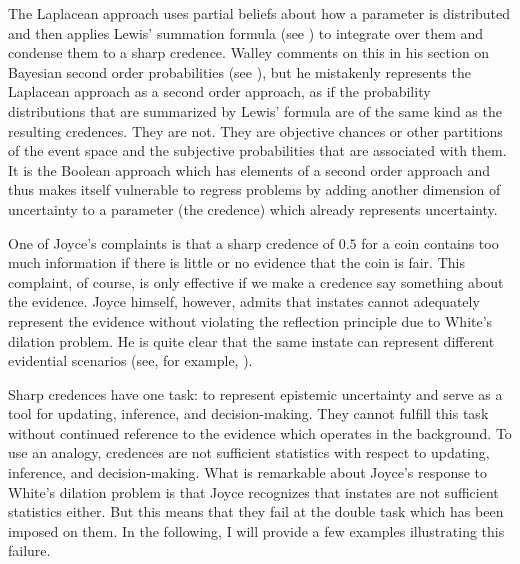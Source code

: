 The Laplacean approach uses partial beliefs about how a
parameter is distributed and then applies Lewis'
summation formula (see ) to
integrate over them and condense them to a sharp
credence. Walley comments on this  in
his section on Bayesian second order probabilities (see
), but he mistakenly
represents the Laplacean approach as a second order
approach, as if the probability distributions that are
summarized by Lewis' formula are of the same kind as
the resulting credences. They are not. They are
objective chances or other partitions of the event
space and the subjective probabilities that are
associated with them. It is the Boolean approach which
has elements of a second order approach and thus makes
itself vulnerable to regress problems by adding another
dimension of uncertainty to a parameter (the credence)
which already represents uncertainty.

One of Joyce's complaints is that a sharp credence of
$0.5$ for a coin contains too much information if there
is little or no evidence that the coin is fair. This
complaint, of course, is only effective if we make a
credence say something about the evidence. Joyce
himself, however, admits that instates cannot
adequately represent the evidence without violating the
reflection principle due to White's dilation problem.
He is quite clear that the same instate can represent
different evidential scenarios (see, for example,
).

Sharp credences have one task: to represent epistemic
uncertainty and serve as a tool for updating,
inference, and decision-making. They cannot fulfill
this task without continued reference to the evidence
which operates in the background. To use an analogy,
credences are not sufficient statistics with respect to
updating, inference, and decision-making. What is
remarkable about Joyce's response to White's dilation
problem is that Joyce recognizes that instates are not
sufficient statistics either. But this means that they
fail at the double task which has been imposed on them.
In the following, I will provide a few examples
illustrating this failure.


